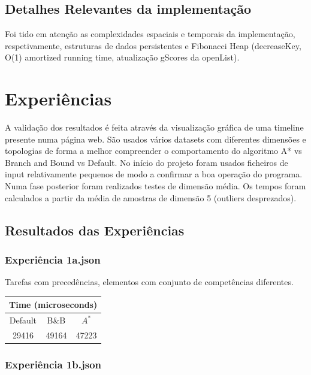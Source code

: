 \documentclass[a4paper,11pt]{article}
\begin{document}
\subsection{Detalhes Relevantes da implementação}

Foi tido em atenção as complexidades espaciais e temporais da implementação, respetivamente, estruturas de dados persistentes e Fibonacci Heap (decreaseKey, O(1) amortized running time, atualização gScores da openList).

\section{Experiências}
A validação dos resultados é feita através da visualização gráfica de uma timeline presente numa página web. São usados vários datasets com diferentes dimensões e topologias de forma a melhor compreender o comportamento do algoritmo A* vs Branch and Bound vs Default. No início do projeto foram usados ficheiros de input relativamente pequenos de modo a confirmar a boa operação do programa. Numa fase posterior foram realizados testes de dimensão média. Os tempos foram calculados a partir da média de amostras de dimensão 5 (outliers desprezados).

\subsection{Resultados das Experiências}
\subsubsection{Experiência 1a.json}

Tarefas com precedências, elementos com conjunto de competências diferentes.

\begin{center}
	\begin{tabular}{|c|c|c|} 
		\hline
		\multicolumn{3}{|c|}{Time (microseconds)} \\
		\hline
		Default & B\&B & $A^*$\\
		\hline
		29416 & 49164 & 47223\\
		\hline
	\end{tabular}
\end{center}

\subsubsection{Experiência 1b.json}
\end{document}
